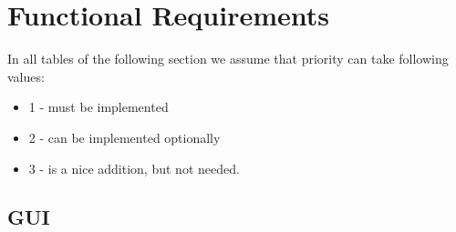 \documentclass{article}
\begin{document}
	

\newpage

\section{Functional Requirements}
In all tables of the following section we assume that priority can take following values:
\begin{itemize} 
\item 1 - must be implemented
\item 2 - can be implemented optionally 
\item 3 - is a nice addition, but not needed.
\end{itemize} 

\subsection{GUI}
\end{document}
